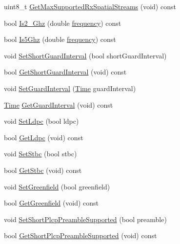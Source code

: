\begin{DoxyCompactItemize}
\item 
uint8\+\_\+t \hyperlink{classns3_1_1WifiPhy_a493d72ea8ba91bb2fda9185c39c419c8}{Get\+Max\+Supported\+Rx\+Spatial\+Streams} (void) const 
\item 
bool \hyperlink{classns3_1_1WifiPhy_aaa5c580b1df6a1a17c45d4499cdde989}{Is2\+\_\+Ghz} (double \hyperlink{mmwave_2model_2fading-traces_2fading__trace__generator_8m_a09045328d6d7e16aa4013f526cc6993d}{frequency}) const 
\item 
bool \hyperlink{classns3_1_1WifiPhy_af20c8a5c10004de2e0e4fb0cb472c763}{Is5\+Ghz} (double \hyperlink{mmwave_2model_2fading-traces_2fading__trace__generator_8m_a09045328d6d7e16aa4013f526cc6993d}{frequency}) const 
\item 
void \hyperlink{classns3_1_1WifiPhy_a3b53079e099f77124695c8d0612fa669}{Set\+Short\+Guard\+Interval} (bool short\+Guard\+Interval)
\item 
bool \hyperlink{classns3_1_1WifiPhy_ae907e448ace9df4d647c8f97bbec23fc}{Get\+Short\+Guard\+Interval} (void) const 
\item 
void \hyperlink{classns3_1_1WifiPhy_a56f3ff8e4a93d94649a3e9982f381d16}{Set\+Guard\+Interval} (\hyperlink{classns3_1_1Time}{Time} guard\+Interval)
\item 
\hyperlink{classns3_1_1Time}{Time} \hyperlink{classns3_1_1WifiPhy_adb22fbf368dfbf0864f08319d8fcb86e}{Get\+Guard\+Interval} (void) const 
\item 
void \hyperlink{classns3_1_1WifiPhy_a2faab5df5e4b2ea107f0dbd611513bdb}{Set\+Ldpc} (bool ldpc)
\item 
bool \hyperlink{classns3_1_1WifiPhy_a36c9adcf0b1f2229891c079016bfcb1b}{Get\+Ldpc} (void) const 
\item 
void \hyperlink{classns3_1_1WifiPhy_aa3c8fd96a62097bfb6a1f3d2ff341d24}{Set\+Stbc} (bool stbc)
\item 
bool \hyperlink{classns3_1_1WifiPhy_aba80990877159beed86abcd9efcc8e13}{Get\+Stbc} (void) const 
\item 
void \hyperlink{classns3_1_1WifiPhy_a4032e55f1488a65bda14ed0e744151df}{Set\+Greenfield} (bool greenfield)
\item 
bool \hyperlink{classns3_1_1WifiPhy_ad7d61a882a8bd1ece3bcb76eeb600d28}{Get\+Greenfield} (void) const 
\item 
void \hyperlink{classns3_1_1WifiPhy_a789dd4fc8853ae0f23718216f7180c80}{Set\+Short\+Plcp\+Preamble\+Supported} (bool preamble)
\item 
bool \hyperlink{classns3_1_1WifiPhy_ad2705695b8839425c7f728d527f66dcc}{Get\+Short\+Plcp\+Preamble\+Supported} (void) const 

\end{DoxyCompactItemize}
